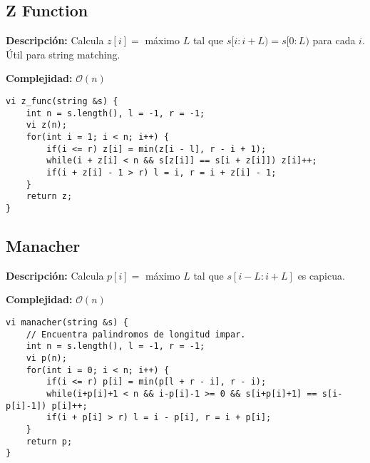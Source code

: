 \documentclass[twocolumn]{article}
\begin{document}
\subsection{Z Function}
\begin{footnotesize}{\bf Descripción: } Calcula $z[i] = $ máximo $L$ tal que $s[i : i + L) = s[0 : L)$ para cada $i$. Útil para string matching.


{\bf Complejidad: } $\mathcal{O}(n)$
\end{footnotesize}\lstset{basicstyle=\footnotesize\ttfamily,breaklines=true,tabsize=2,language=C++,frame=leftline, numbers=left, numberstyle=\tiny, numbersep=5pt}
\begin{lstlisting}
vi z_func(string &s) {
	int n = s.length(), l = -1, r = -1;
	vi z(n);
	for(int i = 1; i < n; i++) {
		if(i <= r) z[i] = min(z[i - l], r - i + 1);
		while(i + z[i] < n && s[z[i]] == s[i + z[i]]) z[i]++;
		if(i + z[i] - 1 > r) l = i, r = i + z[i] - 1;
	}
	return z;
}
\end{lstlisting}
\subsection{Manacher}
\begin{footnotesize}{\bf Descripción: } Calcula $p[i] = $ máximo $L$ tal que $s[i - L : i + L]$ es capicua.


{\bf Complejidad: } $\mathcal{O}(n)$
\end{footnotesize}\lstset{basicstyle=\footnotesize\ttfamily,breaklines=true,tabsize=2,language=C++,frame=leftline, numbers=left, numberstyle=\tiny, numbersep=5pt}
\begin{lstlisting}
vi manacher(string &s) {
	// Encuentra palindromos de longitud impar.
	int n = s.length(), l = -1, r = -1;
	vi p(n);
	for(int i = 0; i < n; i++) {
		if(i <= r) p[i] = min(p[l + r - i], r - i);
		while(i+p[i]+1 < n && i-p[i]-1 >= 0 && s[i+p[i]+1] == s[i-p[i]-1]) p[i]++;
		if(i + p[i] > r) l = i - p[i], r = i + p[i];
	}
	return p;
}
\end{lstlisting}
\end{document}
